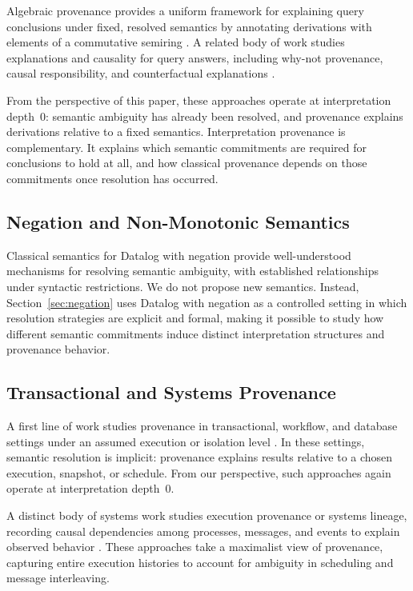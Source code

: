 \documentclass[acmsmall,nonacm]{acmart}
\theoremstyle{remark}
\numberwithin{definition}{section}
\numberwithin{theorem}{section}
\numberwithin{lemma}{section}
\numberwithin{corollary}{section}
\numberwithin{remark}{section}
\numberwithin{example}{section}
\numberwithin{observation}{section}
\numberwithin{assumption}{section}
\begin{document}
Algebraic provenance provides a uniform framework for explaining query
conclusions under fixed, resolved semantics by annotating derivations with
elements of a commutative semiring
\cite{green2007provenance,suciu2011probabilistic,dalvi2012probabilistic,olteanu2015factorized,senellart2018provenance}.
A related body of work studies explanations and causality for query answers,
including why-not provenance, causal responsibility, and counterfactual
explanations
\cite{buneman2001why,halpern2001causes,meliou2010causality,glavic2015survey}.

From the perspective of this paper, these approaches operate at
interpretation depth~0: semantic ambiguity has already been resolved, and
provenance explains derivations relative to a fixed semantics.
Interpretation provenance is complementary.
It explains which semantic commitments are required for conclusions to hold
at all, and how classical provenance depends on those commitments once
resolution has occurred.

\subsection{Negation and Non-Monotonic Semantics}

Classical semantics for Datalog with negation provide well-understood mechanisms
for resolving semantic ambiguity, with established relationships under syntactic
restrictions.
We do not propose new semantics.
Instead, Section~\ref{sec:negation} uses Datalog with negation as a controlled
setting in which resolution strategies are explicit and formal, making it
possible to study how different semantic commitments induce distinct
interpretation structures and provenance behavior.

\subsection{Transactional and Systems Provenance}

A first line of work studies provenance in transactional, workflow, and database
settings under an assumed execution or isolation level
\cite{bernstein1987concurrency,adya1999weak,cerone2015consistency,cheney2009provenance,freire2008provenance}.
In these settings, semantic resolution is implicit: provenance explains results
relative to a chosen execution, snapshot, or schedule.
From our perspective, such approaches again operate at interpretation depth~0.

A distinct body of systems work studies execution provenance or systems lineage,
recording causal dependencies among processes, messages, and events to explain
observed behavior
\cite{seltzer2005provenance,bates2015trustworthy,sigelman2010dapper}.
These approaches take a maximalist view of provenance, capturing entire execution
histories to account for ambiguity in scheduling and message interleaving.
\end{document}
